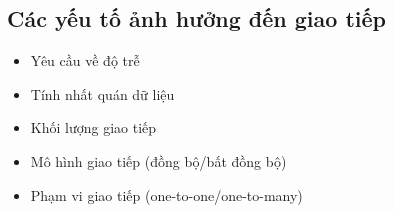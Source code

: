 \subsection{Các yếu tố ảnh hưởng đến giao tiếp}
\begin{itemize}
    \item Yêu cầu về độ trễ
    \item Tính nhất quán dữ liệu
    \item Khối lượng giao tiếp
    \item Mô hình giao tiếp (đồng bộ/bất đồng bộ)
    \item Phạm vi giao tiếp (one-to-one/one-to-many)
\end{itemize} 